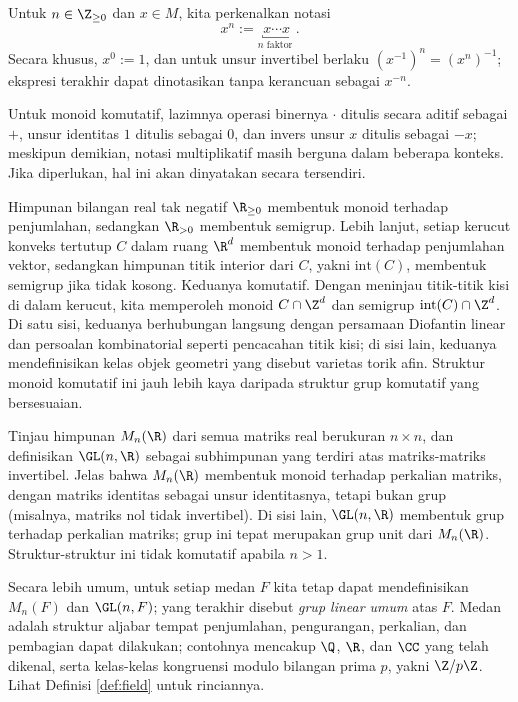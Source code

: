 Untuk $n \in \Z_{\geq 0}$ dan $x \in M$, kita perkenalkan notasi
\[ x^n := \underbracket{x \cdots x}_{n \text{ faktor }}. \]
Secara khusus, $x^0:=1$, dan untuk unsur invertibel berlaku $(x^{-1})^n=(x^n)^{-1}$; ekspresi terakhir dapat dinotasikan tanpa kerancuan sebagai $x^{-n}$.

\begin{convention}
	Untuk monoid komutatif, lazimnya operasi binernya $\cdot$ ditulis secara aditif sebagai $+$, unsur identitas $1$ ditulis sebagai $0$, dan invers unsur $x$ ditulis sebagai $-x$; meskipun demikian, notasi multiplikatif masih berguna dalam beberapa konteks. Jika diperlukan, hal ini akan dinyatakan secara tersendiri.
\end{convention}

\begin{example}
	Himpunan bilangan real tak negatif $\R_{\geq 0}$ membentuk monoid terhadap penjumlahan, sedangkan $\R_{>0}$ membentuk semigrup. Lebih lanjut, setiap kerucut konveks tertutup $C$ dalam ruang $\R^d$ membentuk monoid terhadap penjumlahan vektor, sedangkan himpunan titik interior dari $C$, yakni $\text{int}(C)$, membentuk semigrup jika tidak kosong. Keduanya komutatif. Dengan meninjau titik-titik kisi di dalam kerucut, kita memperoleh monoid $C \cap \Z^d$ dan semigrup $\text{int}(C) \cap \Z^d$. Di satu sisi, keduanya berhubungan langsung dengan persamaan Diofantin linear dan persoalan kombinatorial seperti pencacahan titik kisi; di sisi lain, keduanya mendefinisikan kelas objek geometri yang disebut varietas torik afin. Struktur monoid komutatif ini jauh lebih kaya daripada struktur grup komutatif yang bersesuaian.
\end{example}

\begin{example}
	Tinjau himpunan $M_n(\R)$ dari semua matriks real berukuran $n \times n$, dan definisikan $\GL(n,\R)$ sebagai subhimpunan yang terdiri atas matriks-matriks invertibel. Jelas bahwa $M_n(\R)$ membentuk monoid terhadap perkalian matriks, dengan matriks identitas sebagai unsur identitasnya, tetapi bukan grup (misalnya, matriks nol tidak invertibel). Di sisi lain, $\GL(n,\R)$ membentuk grup terhadap perkalian matriks; grup ini tepat merupakan grup unit dari $M_n(\R)$. Struktur-struktur ini tidak komutatif apabila $n>1$.
	
	Secara lebih umum, untuk setiap medan $F$ kita tetap dapat mendefinisikan $M_n(F)$ dan $\GL(n,F)$; yang terakhir disebut \emph{grup linear umum} atas $F$. Medan adalah struktur aljabar tempat penjumlahan, pengurangan, perkalian, dan pembagian dapat dilakukan; contohnya mencakup $\Q$, $\R$, dan $\CC$ yang telah dikenal, serta kelas-kelas kongruensi modulo bilangan prima $p$, yakni $\Z/p\Z$. Lihat Definisi \ref{def:field} untuk rinciannya.
\end{example}

